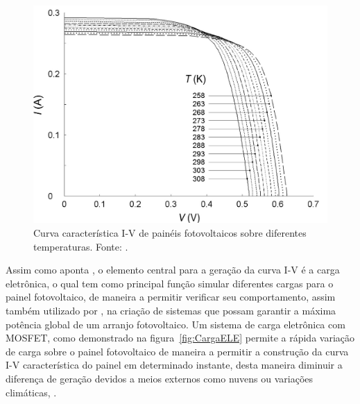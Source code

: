 \FloatBarrier
\begin{figure}[!htbp]
	\centering
	\includegraphics[scale=0.3]{imagens/IxV_Temp}
	\caption{Curva característica I-V de painéis fotovoltaicos sobre diferentes temperaturas. Fonte: . }
	
	\label{fig:IVTemp}
\end{figure}
\FloatBarrier

Assim como aponta , o elemento central para a geração da curva I-V é a carga eletrônica, o qual tem como principal função simular diferentes cargas para o painel fotovoltaico, de maneira a permitir verificar seu comportamento, assim também utilizado por , na criação de sistemas que possam garantir a máxima potência global de um arranjo fotovoltaico. Um sistema de carga eletrônica com MOSFET, como demonstrado na figura~\ref{fig:CargaELE} permite a rápida variação de carga sobre o painel fotovoltaico de maneira a permitir a construção da curva I-V característica do painel em determinado instante, desta maneira diminuir a diferença de geração devidos a meios externos como nuvens ou variações climáticas, \cite{WILLOUGHBY2018171}.%


